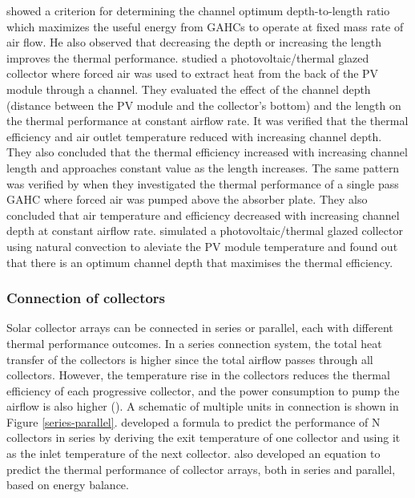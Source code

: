 \citet{Hegazy1999} showed a criterion for determining the channel optimum depth-to-length ratio which maximizes the useful energy from GAHCs to operate at fixed mass rate of air flow. He also observed that decreasing the depth or increasing the length improves the thermal performance. \citet{Tonui2007} studied a photovoltaic/thermal glazed collector where forced air was used to extract heat from the back of the PV module through a channel. They evaluated the effect of the channel depth (distance between the PV module and the collector's bottom) and the length on the thermal performance at constant airflow rate. It was verified that the thermal efficiency and air outlet temperature reduced with increasing channel depth. They also concluded that the thermal efficiency increased with increasing channel length and approaches constant value as the length increases. The same pattern was verified by \citet{Yousef2008} when they investigated the thermal performance of a single pass GAHC where forced air was pumped above the absorber plate. They also concluded that air temperature and efficiency decreased with increasing channel depth at constant airflow rate. \citet{Tonui2008} simulated a photovoltaic/thermal glazed collector using natural convection to aleviate the PV module temperature and found out that there is an optimum channel depth that maximises the thermal efficiency. 

\subsubsection{Connection of collectors}

Solar collector arrays can be connected in series or parallel, each with different thermal performance outcomes. In a series connection system, the total heat transfer of the collectors is higher since the total airflow passes through all collectors. However, the temperature rise in the collectors reduces the thermal efficiency of each progressive collector, and the power consumption to pump the airflow is also higher (\cite{Hastings2000}). A schematic of multiple units in connection is shown in Figure \ref{series-parallel}. \citet{Oonk1979} developed a formula to predict the performance of N collectors in series by deriving the exit temperature of one collector and using it as the inlet temperature of the next collector. \citet{Fanney1981} also developed an equation to predict the thermal performance of collector arrays, both in series and parallel, based on energy balance.

